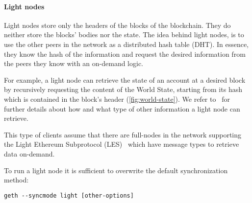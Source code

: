 \paragraph{Light nodes}
Light nodes store only the headers of the blocks of the blockchain. They do
neither store the blocks' bodies nor the state. The idea behind light nodes, is
to use the other peers in the network as a distributed hash table (DHT).
In essence, they know the hash of the information and request the desired
information from the peers they know with an on-demand logic.

For example, a light node can retrieve the state of an account at a desired
block by recursively requesting the content of the World State, starting from
its hash which is contained in the block's header (\autoref{fig:world-state}).
We refer to~\cite{bib:light-client} for further details about how and what type
of other information a light node can retrieve.

This type of clients assume that there are full-nodes in the network supporting
the Light Ethereum Subprotocol (LES)~\cite{bib:les-protocol} which have message
types to retrieve data on-demand.

To run a light node it is sufficient to overwrite the default synchronization
method:
\begin{center}
    \verb|geth --syncmode light [other-options]|
\end{center}